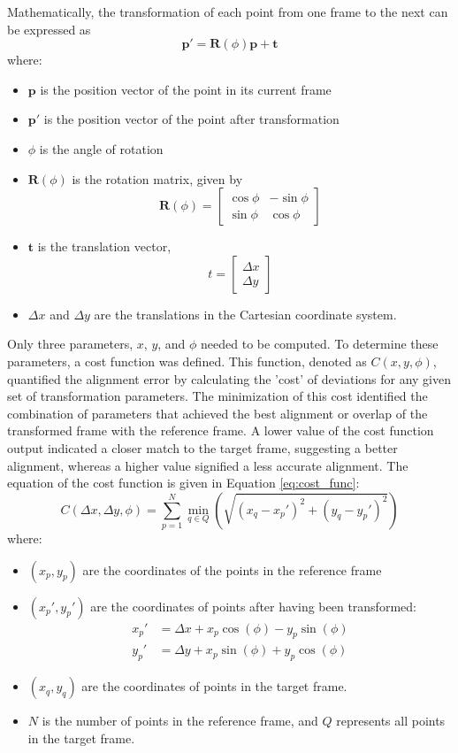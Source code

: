 \documentclass{micro-econ-thesis}
\begin{document}
Mathematically, the transformation of each point from one frame to the next can be expressed as 
\begin{equation}
	\mathbf{p'} = \mathbf{R}(\phi) \mathbf{p} + \mathbf{t}
	\label{eq:rot} 
\end{equation}
where: 
\begin{itemize}
	\item $\mathbf{p}$ is the position vector of the point in its current frame
	\item $\mathbf{p'}$ is the position vector of the point after transformation
	\item $\phi$ is the angle of rotation
	\item $\mathbf{R}(\phi)$  is the rotation matrix, given by 
	 \[
	 \mathbf{R}(\phi) = 
	 \begin{bmatrix}
	 	\cos \phi & -\sin \phi \\
	 	\sin \phi & \cos \phi
	 \end{bmatrix}
	 \]
	 
	 \item $\mathbf{t}$ is the translation vector,
	 	\[
	 	t = \begin{bmatrix}
	 		\Delta x \\
	 		\Delta y
	 	\end{bmatrix}
	 	\]
 	\item $\Delta x$ and $\Delta y$ are the translations in the Cartesian coordinate system. 
\end{itemize}   
Only three parameters, $x$, $y$, and $\phi$ needed to be computed. To determine these parameters, a cost function was defined. This function, denoted as $C(x,y,\phi)$, quantified the alignment error by calculating the 'cost' of deviations for any given set of transformation parameters. The minimization of this cost identified the combination of parameters that achieved the best alignment or overlap of the transformed frame with the reference frame. A lower value of the cost function output indicated a closer match to the target frame, suggesting a better alignment, whereas a higher value signified a less accurate alignment. The equation of the cost function is given in Equation \ref{eq:cost_func}:  
\begin{equation}
	C(\Delta x, \Delta y, \phi) = \sum_{p=1}^{N} \min_{q \in Q} \left( \sqrt{(x_q - x_p')^2 + (y_q - y_p')^2} \right)
	\label{eq:cost_func}
\end{equation}
where:
\begin{itemize}
	\item $ (x_p, y_p) $ are the coordinates of the points in the reference frame
	\item $(x_p', y_p')$ are the coordinates of points after having been transformed:
	\begin{align*}
		x_p' &= \Delta x + x_p \cos(\phi) - y_p \sin(\phi) \\
		y_p' &= \Delta y + x_p \sin(\phi) + y_p \cos(\phi)
	\end{align*}
	\item $(x_q, y_q)$ are the coordinates of points in the target frame.
	\item $N$ is the number of points in the reference frame, and $Q$ represents all points in the target frame.
\end{itemize}
\end{document}
